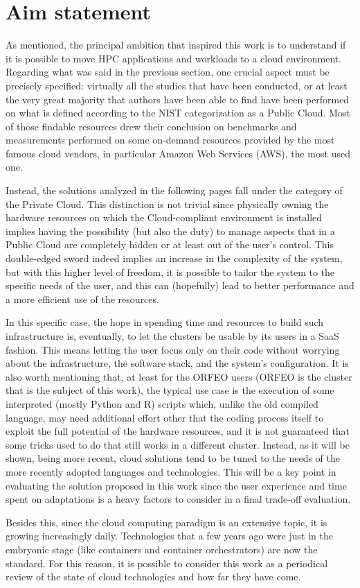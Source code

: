 \section*{Aim statement}

As mentioned, the principal ambition that inspired this work is to understand if
it is possible to move HPC applications and workloads to a cloud environment.
Regarding what was said in the previous section, one crucial aspect must
be precisely specified: virtually all the studies that have been conducted, or
at least the very great majority that authors have been able to find have been
performed on what is defined according to the NIST categorization as a Public
Cloud.
Most of those findable resources drew their conclusion on benchmarks and
measurements performed on some on-demand resources provided by the most famous
cloud vendors, in particular Amazon Web Services (AWS), the most used one.

Instead, the solutions analyzed in the following pages fall under the category
of the Private Cloud.
This distinction is not trivial since physically owning the hardware resources
on which the Cloud-compliant environment is installed implies having the
possibility (but also the duty) to manage aspects that in a Public Cloud are
completely hidden or at least out of the user's control.
This double-edged sword indeed implies an increase in the complexity of the
system, but with this higher level of freedom, it is possible to tailor the
system to the specific needs of the user, and this can (hopefully) lead to
better performance and a more efficient use of the resources.

In this specific case, the hope in spending time and resources to build such
infrastructure is, eventually, to let the clusters be usable by its users in
a SaaS fashion. This means letting the user focus only on their code without
worrying about the infrastructure, the software stack, and the system's
configuration.
It is also worth mentioning that, at least for the ORFEO users (ORFEO is the
cluster that is the subject of this work), the typical use case is the execution
of some interpreted (mostly Python and R) scripts which, unlike the old compiled
language, may need additional effort other that the coding process itself to
exploit the full potential of the hardware resources, and it is not guaranteed
that some tricks used to do that still works in a different cluster.
Instead, as it will be shown, being more recent, cloud solutions tend to be
tuned to the needs of the more recently adopted languages and technologies.
This will be a key point in evaluating the solution proposed in this work since
the user experience and time spent on adaptations is a heavy factors to consider
in a final trade-off evaluation.

Besides this, since the cloud computing paradigm is an extensive topic, it is
growing increasingly daily. Technologies that a few years ago were just in
the embryonic stage (like containers and container orchestrators) are now the
standard. For this reason, it is possible to consider this work as a periodical
review of the state of cloud technologies and how far they have come.
